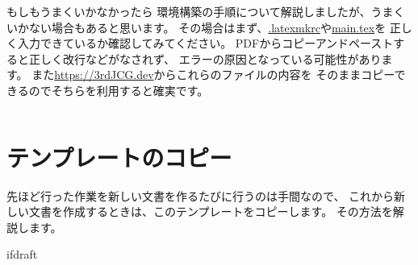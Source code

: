 		\begin{column}{もしもうまくいかなかったら}
			環境構築の手順について解説しましたが、うまくいかない場合もあると思います。
			その場合はまず、\url{.latexmkrc}や\url{main.tex}を
			正しく入力できているか確認してみてください。
			PDFからコピーアンドペーストすると正しく改行などがなされず、
			エラーの原因となっている可能性があります。
			また\url{https://3rdJCG.dev}からこれらのファイルの内容を
			そのままコピーできるのでそちらを利用すると確実です。
		\end{column}

	\section{テンプレートのコピー}
		先ほど行った作業を新しい文書を作るたびに行うのは手間なので、
		これから新しい文書を作成するときは、このテンプレートをコピーします。
		その方法を解説します。

		
		
		\expandafter\ifx\csname ifdraft\endcsname\relax

\fi